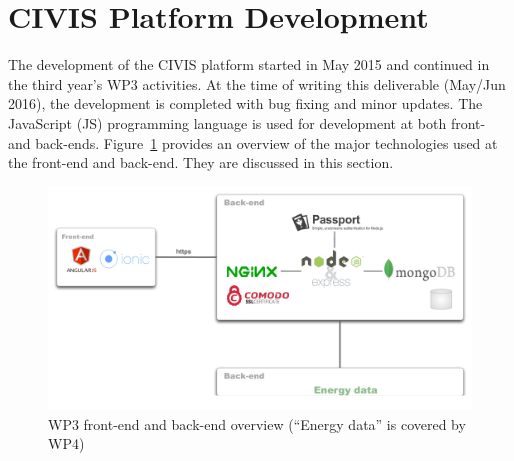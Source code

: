 \section{CIVIS Platform  Development} 
\label{sec:develop}
 
The development of the CIVIS platform started in May 2015 \citep{Huang2015c} and continued in the third year's WP3 activities. At the time of writing this deliverable (May/Jun 2016), the development is completed with bug fixing and minor updates.
% 
The JavaScript (JS) programming language %
is used for development at both front- and back-ends. 
Figure~\ref{fig:ScreenShot2015-11-09at18} provides an overview of the major technologies used at the front-end and back-end. They are discussed in this section. 

\begin{figure}[h!]
\centering
\includegraphics[width=0.9\linewidth]{img/architecture.pdf}
\caption{WP3 front-end and back-end overview (``Energy data'' is covered by WP4)}
\label{fig:ScreenShot2015-11-09at18}
\end{figure}





